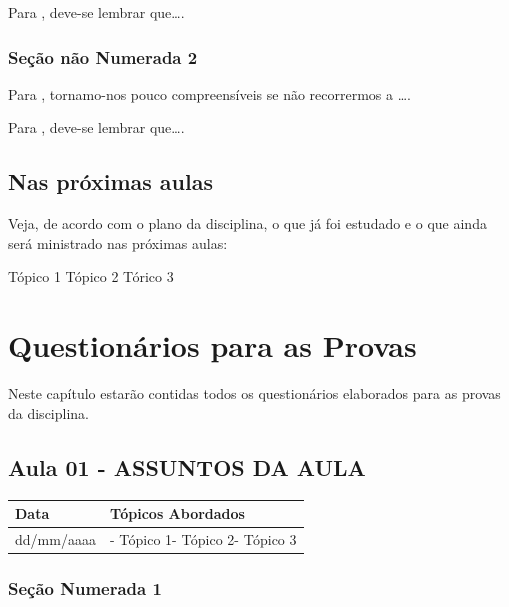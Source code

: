 \documentclass[
]{book}
\begin{document}
Para \citet{DAVIDOFF2001}, deve-se lembrar que\ldots.

\hypertarget{seuxe7uxe3o-nuxe3o-numerada-2-29}{%
\subsection*{Seção não Numerada 2}\label{seuxe7uxe3o-nuxe3o-numerada-2-29}}

Para \citet{BOCK2001}, tornamo-nos pouco compreensíveis se não recorrermos a \ldots.

Para \citet{DAVIDOFF2001}, deve-se lembrar que\ldots.

\hypertarget{nas-pruxf3ximas-aulas-4}{%
\section{Nas próximas aulas}\label{nas-pruxf3ximas-aulas-4}}

Veja, de acordo com o plano da disciplina, o que já foi estudado e o que ainda será ministrado nas próximas aulas:

Tópico 1
Tópico 2
Tórico 3

\hypertarget{questionuxe1rios-para-as-provas}{%
\chapter{Questionários para as Provas}\label{questionuxe1rios-para-as-provas}}

Neste capítulo estarão contidas todos os questionários elaborados para as provas da disciplina.

\hypertarget{aula-01---assuntos-da-aula-3}{%
\section{Aula 01 - ASSUNTOS DA AULA}\label{aula-01---assuntos-da-aula-3}}

\begin{longtable}[]{@{}ll@{}}
\toprule()
Data & Tópicos Abordados \\
\midrule()
\endhead
dd/mm/aaaa & - Tópico 1- Tópico 2- Tópico 3 \\
\bottomrule()
\end{longtable}

\hypertarget{seuxe7uxe3o-numerada-1-10}{%
\subsection{Seção Numerada 1}\label{seuxe7uxe3o-numerada-1-10}}
\end{document}
